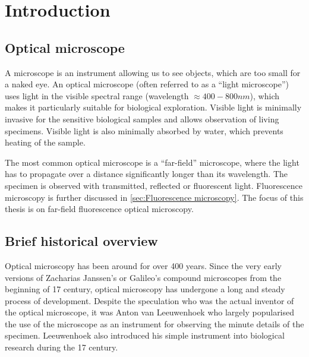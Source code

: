 \chapter{Introduction\label{ch:Introduction}}


\section{Optical microscope} %

A microscope is an instrument allowing us to see objects, which are too small for a naked eye. An optical microscope (often referred to as a ``light microscope'') uses light in the visible spectral range (wavelength $\approx400-800\unit{nm}$), which makes it particularly suitable for biological exploration. Visible light is minimally invasive for the sensitive biological samples and allows observation of living specimens. Visible light is also minimally absorbed by water, which prevents heating of the sample.

 The most common optical microscope is a ``far-field'' microscope, where the light has to propagate over a distance significantly longer than its wavelength. The specimen is observed with transmitted, reflected or fluorescent light. Fluorescence microscopy is further discussed in \autoref{sec:Fluorescence microscopy}. The focus of this thesis is on far-field fluorescence optical microscopy.


\section{Brief historical overview}

Optical microscopy has been around for over 400 years. Since the very early versions of Zacharias Janssen's or Galileo's compound microscopes from the beginning of 17\ths{} century, optical microscopy has undergone a long and steady process of development. Despite the speculation who was the actual inventor of the optical microscope, it was Anton van Leeuwenhoek who largely popularised the use of the microscope as an instrument for observing the minute details of the specimen. Leeuwenhoek also introduced his simple instrument into biological research during the 17\ths{} century.

